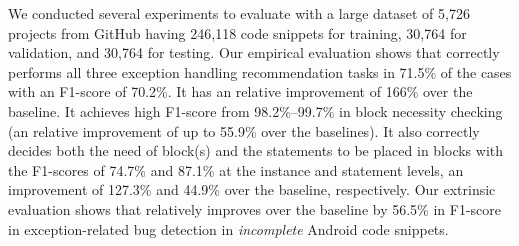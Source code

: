 %

We conducted several experiments to evaluate {\tool} with
a large dataset of 5,726 projects from GitHub
having 246,118 code snippets for training, 30,764 for validation,
and 30,764 for testing.
Our empirical evaluation shows that {\tool} correctly performs all
three exception handling recommendation tasks in 71.5\% of the cases
with an F1-score of 70.2\%. It has an relative improvement of 166\%
over the baseline. It achieves high F1-score from 98.2\%--99.7\% in
 block necessity checking (an relative improvement of
up to 55.9\% over the baselines). It also correctly decides both the
need of  block(s) and the statements to be placed in
 blocks with the F1-scores of 74.7\% and 87.1\% at the instance
and statement levels, an improvement of 127.3\% and 44.9\% over the
baseline, respectively. Our extrinsic evaluation shows that {\tool}
relatively improves over the baseline by 56.5\% in F1-score in
exception-related bug detection in {\em incomplete} Android code
snippets.

